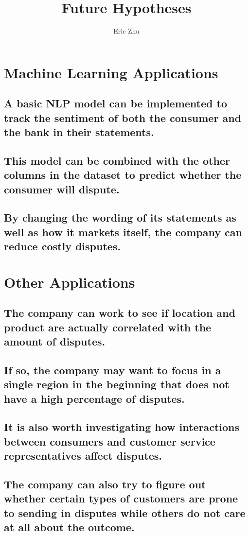 \documentclass{article}
\title{Future Hypotheses}
\author{Eric Zhu}
\begin{document}
\maketitle
\section{Machine Learning Applications}
\subsection{A basic NLP model can be implemented to track the sentiment of both the consumer and the bank in their statements.}
\subsection{This model can be combined with the other columns in the dataset to predict whether the consumer will dispute.}
\subsection{By changing the wording of its statements as well as how it markets itself, the company can reduce costly disputes.}
\section{Other Applications}
\subsection{The company can work to see if location and product are actually correlated with the amount of disputes.}
\subsection{If so, the company may want to focus in a single region in the beginning that does not have a high percentage of disputes.}
\subsection{It is also worth investigating how interactions between consumers and customer service representatives affect disputes.}
\subsection{The company can also try to figure out whether certain types of customers are prone to sending in disputes while others do not care at all about the outcome.}
\end{document}

